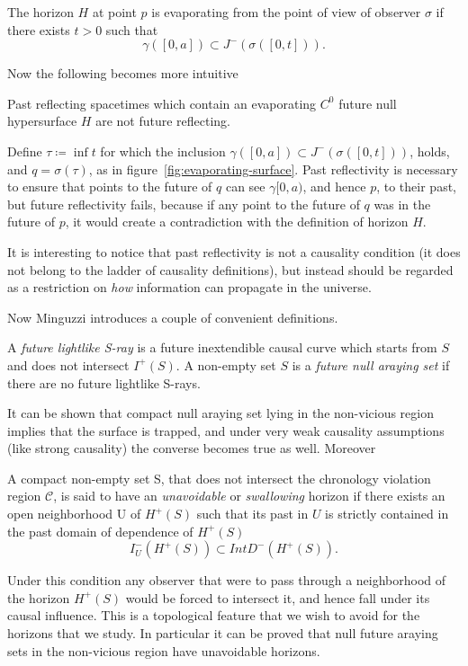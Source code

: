 	\begin{definition}
		The horizon \(H\) at point \(p\) is evaporating from the point of view of observer \(\sigma\) if there exists \(t > 0\) such that
		\[
		\gamma \left([0, a]\right) \subset J^-\left(\sigma\left([0, t]\right)\right).	
		\] 
	\end{definition}
	\noindent Now the following becomes more intuitive
	\begin{theorem}
		Past reflecting spacetimes which contain an evaporating \(C^0\) future null hypersurface \(H\) are not future reflecting.
	\end{theorem}
	Define \(\tau \coloneqq \inf t\) for which the inclusion \(\gamma \left([0, a]\right) \subset J^-\left(\sigma\left([0, t]\right)\right)\), holds, and \(q = \sigma(\tau)\), as in figure~\ref{fig:evaporating-surface}.
	Past reflectivity is necessary to ensure that points to the future of \(q\) can see \(\gamma[0,a)\), and hence \(p\), to their past, but future reflectivity fails, because if any point to the future of \(q\) was in the future of \(p\), it would create a contradiction with the definition of horizon \(H\). 
	\begin{remark}
		It is interesting to notice that past reflectivity is not a causality condition (it does not belong to the ladder of causality definitions), but instead should be regarded as a restriction on \emph{how} information can propagate in the universe.
	\end{remark}

	Now Minguzzi introduces a couple of convenient definitions.
	\begin{definition}
		A \emph{future lightlike S-ray} is a future inextendible causal curve which starts from \(S\) and does not intersect \(I^+(S)\). A non-empty set \(S\) is a \emph{future null araying set} if there are no future lightlike S-rays. 
	\end{definition}
	It can be shown that compact null araying set lying in the non-vicious region implies that the surface is trapped, and under very weak causality assumptions (like strong causality) the converse becomes true as well. Moreover
	\begin{definition}
		A compact non-empty set S, that does not intersect the chronology violation region \(\mathcal{C}\), is said to have an \emph{unavoidable} or \emph{swallowing} horizon if there exists an open neighborhood U of \(H^+(S)\) such that its past in \(U\) is strictly contained in the past domain of dependence of \(H^+(S)\) 
		\[
			I^-_U(H^+(S)) \subset Int D^-(H^+(S)).	
		\]
	\end{definition}
	Under this condition any observer that were to pass through a neighborhood of the horizon \(H^+(S)\) would be forced to intersect it, and hence fall under its causal influence. This is a topological feature that we wish to avoid for the horizons that we study. In particular it can be proved that null future araying sets in the non-vicious region have unavoidable horizons.

